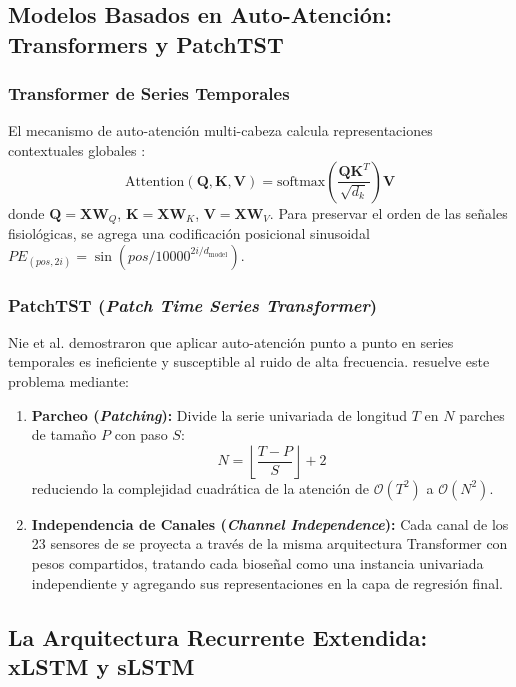 \subsection{Modelos Basados en Auto-Atención: Transformers y PatchTST}

\subsubsection{Transformer de Series Temporales}
El mecanismo de auto-atención multi-cabeza calcula representaciones contextuales globales \cite{vaswani2017attention}:
\begin{equation}
    \text{Attention}(\bm{Q}, \bm{K}, \bm{V}) = \text{softmax}\left(\frac{\bm{Q}\bm{K}^T}{\sqrt{d_k}}\right)\bm{V}
\end{equation}
donde $\bm{Q} = \bm{X}\bm{W}_Q$, $\bm{K} = \bm{X}\bm{W}_K$, $\bm{V} = \bm{X}\bm{W}_V$. Para preservar el orden de las señales fisiológicas, se agrega una codificación posicional sinusoidal $PE_{(pos, 2i)} = \sin(pos/10000^{2i/d_{\text{model}}})$.

\subsubsection{PatchTST (\textit{Patch Time Series Transformer})}
Nie et al. \cite{nie2023time} demostraron que aplicar auto-atención punto a punto en series temporales es ineficiente y susceptible al ruido de alta frecuencia. \patchtst{} resuelve este problema mediante:
\begin{enumerate}
    \item \textbf{Parcheo (\textit{Patching}):} Divide la serie univariada de longitud $T$ en $N$ parches de tamaño $P$ con paso $S$:
    \begin{equation}
        N = \left\lfloor \frac{T - P}{S} \right\rfloor + 2
    \end{equation}
    reduciendo la complejidad cuadrática de la atención de $\mathcal{O}(T^2)$ a $\mathcal{O}(N^2)$.
    \item \textbf{Independencia de Canales (\textit{Channel Independence}):} Cada canal de los 23 sensores de \fatigueset{} se proyecta a través de la misma arquitectura Transformer con pesos compartidos, tratando cada bioseñal como una instancia univariada independiente y agregando sus representaciones en la capa de regresión final.
\end{enumerate}

\subsection{La Arquitectura Recurrente Extendida: xLSTM y sLSTM}

